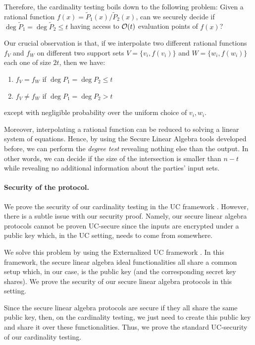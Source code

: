 Therefore, the cardinality testing boils down to the following problem: Given a rational function $f(x)=\tilde P_1(x)/\tilde P_2(x)$, can we securely decide if  $\deg \tilde P_1=\deg \tilde P_2\leq t$ having access to $\mathcal{O}(t)$ evaluation points of $f(x)$? 

Our crucial observation is that, if we interpolate two different rational functions $f_V$ and $f_W$ on different two support sets $V=\{v_i,f(v_i)\}$ and $W=\{w_i,f(w_i)\}$ each one of size $2t$, then we have: \begin{enumerate}
    \item $f_V=f_W$ if $\deg P_1=\deg P_2\leq t$
    \item $f_V\neq f_W$ if $\deg P_1=\deg P_2> t$
\end{enumerate}{} except with negligible probability over the uniform choice of $v_i,w_i$.

Moreover, interpolating a rational function can be reduced to solving a linear system of equations. Hence, by using the Secure Linear Algebra tools developed before, we can perform the \emph{degree test} revealing nothing else than the output. In other words, we can decide if the size of the intersection is smaller than $n-t$ while revealing no additional information about the parties' input sets.



\paragraph{Security of the protocol.}
We prove the security of our  cardinality testing in the UC framework \cite{FOCS:Canetti01}. However, there is a subtle issue with our security proof. Namely, our secure linear algebra protocols cannot be proven UC-secure since the inputs are encrypted under a public key which, in the UC setting, needs to come from somewhere. 

We solve this problem by using the Externalized UC framework \cite{TCC:CDPW07}. In this framework, the secure linear algebra ideal functionalities all share a common setup which, in our case, is the public key (and the corresponding secret key shares). We prove the security of our secure linear algebra protocols in this setting. 


Since the secure linear algebra protocols are secure if they all share the same public key, then, on the cardinality testing, we just need to create this public key and share it over these functionalities. Thus, we prove the standard UC-security of our cardinality testing.

